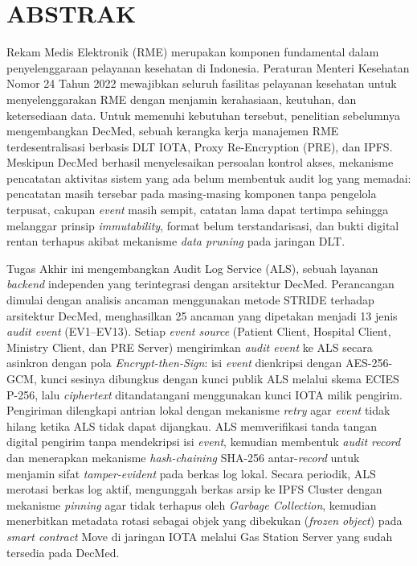 \clearpage
\chapter*{ABSTRAK}

\begin{singlespace}
	\small
	Rekam Medis Elektronik (RME) merupakan komponen fundamental dalam penyelenggaraan pelayanan kesehatan di Indonesia. Peraturan Menteri Kesehatan Nomor 24 Tahun 2022 mewajibkan seluruh fasilitas pelayanan kesehatan untuk menyelenggarakan RME dengan menjamin kerahasiaan, keutuhan, dan ketersediaan data. Untuk memenuhi kebutuhan tersebut, penelitian sebelumnya mengembangkan DecMed, sebuah kerangka kerja manajemen RME terdesentralisasi berbasis DLT IOTA, Proxy Re-Encryption (PRE), dan IPFS. Meskipun DecMed berhasil menyelesaikan persoalan kontrol akses, mekanisme pencatatan aktivitas sistem yang ada belum membentuk audit log yang memadai: pencatatan masih tersebar pada masing-masing komponen tanpa pengelola terpusat, cakupan \textit{event} masih sempit, catatan lama dapat tertimpa sehingga melanggar prinsip \textit{immutability}, format belum terstandarisasi, dan bukti digital rentan terhapus akibat mekanisme \textit{data pruning} pada jaringan DLT.

	Tugas Akhir ini mengembangkan Audit Log Service (ALS), sebuah layanan \textit{backend} independen yang terintegrasi dengan arsitektur DecMed. Perancangan dimulai dengan analisis ancaman menggunakan metode STRIDE terhadap arsitektur DecMed, menghasilkan 25 ancaman yang dipetakan menjadi 13 jenis \textit{audit event} (EV1--EV13). Setiap \textit{event source} (Patient Client, Hospital Client, Ministry Client, dan PRE Server) mengirimkan \textit{audit event} ke ALS secara asinkron dengan pola \textit{Encrypt-then-Sign}: isi \textit{event} dienkripsi dengan AES-256-GCM, kunci sesinya dibungkus dengan kunci publik ALS melalui skema ECIES P-256, lalu \textit{ciphertext} ditandatangani menggunakan kunci IOTA milik pengirim. Pengiriman dilengkapi antrian lokal dengan mekanisme \textit{retry} agar \textit{event} tidak hilang ketika ALS tidak dapat dijangkau. ALS memverifikasi tanda tangan digital pengirim tanpa mendekripsi isi \textit{event}, kemudian membentuk \textit{audit record} dan menerapkan mekanisme \textit{hash-chaining} SHA-256 antar-\textit{record} untuk menjamin sifat \textit{tamper-evident} pada berkas log lokal. Secara periodik, ALS merotasi berkas log aktif, mengunggah berkas arsip ke IPFS Cluster dengan mekanisme \textit{pinning} agar tidak terhapus oleh \textit{Garbage Collection}, kemudian menerbitkan metadata rotasi sebagai objek yang dibekukan (\textit{frozen object}) pada \textit{smart contract} Move di jaringan IOTA melalui Gas Station Server yang sudah tersedia pada DecMed.


\end{singlespace}
